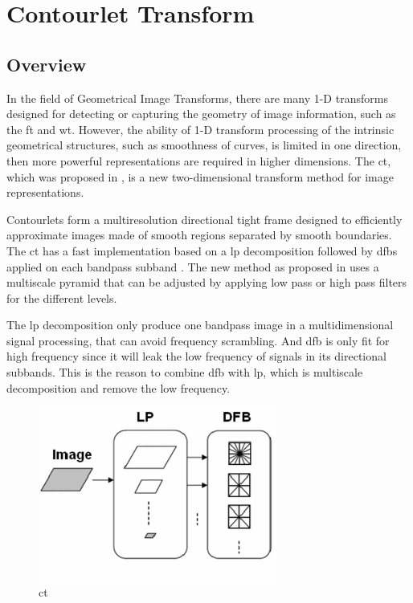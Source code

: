 \section{Contourlet Transform}

\subsection{Overview}
In the field of Geometrical Image Transforms, there are many 1-D transforms designed for detecting or capturing the geometry of image information, such as the \gls{ft} and \gls{wt}. However, the ability of 1-D transform processing of the intrinsic geometrical structures, such as smoothness of curves, is limited in one direction, then more powerful representations are required in higher dimensions. The \gls{ct}, which was proposed in \cite{do2005contourlet}, is a new two-dimensional transform method for image representations.

Contourlets form a multiresolution directional tight frame designed to efficiently approximate images made of smooth regions separated by smooth boundaries. The \gls{ct} has a fast implementation based on a \gls{lp} decomposition followed by \glspl{dfb} applied on each bandpass subband \cite{suresh2014artificial}. The new method as proposed in \cite{lu2006new} uses a multiscale pyramid that can be adjusted by applying low pass or high pass filters for the different levels.

The \gls{lp} decomposition only produce one bandpass image in a multidimensional signal processing, that can avoid frequency scrambling. And \gls{dfb} is only fit for high frequency since it will leak the low frequency of signals in its directional subbands. This is the reason to combine \gls{dfb} with \gls{lp}, which is multiscale decomposition and remove the low frequency.

\begin{figure}[H]
	\centering
	\includegraphics[width=0.7\textwidth]{fig/contourlet}
	\caption{\glsdesc{ct}}
	\label{fig:contourlet}
\end{figure}

